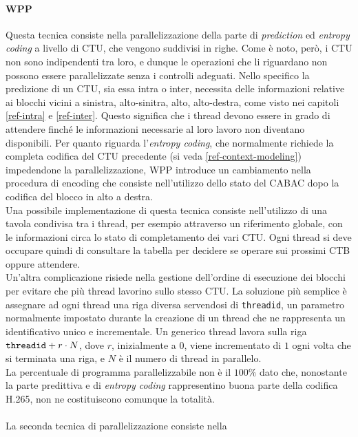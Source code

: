 \paragraph*{WPP} Questa tecnica consiste nella parallelizzazione della parte di 
\emph{prediction} ed \emph{entropy coding} a livello di CTU, che vengono 
suddivisi in righe.
Come è noto, però, i CTU non sono 
indipendenti tra loro, e dunque le operazioni che li riguardano non possono 
essere parallelizzate senza i controlli adeguati. Nello specifico la predizione 
di un CTU, sia essa intra o inter, necessita delle informazioni relative ai 
blocchi vicini a sinistra, alto-sinitra, alto, alto-destra, come visto nei 
capitoli \ref{ref-intra} e \ref{ref-inter}. Questo 
significa che i thread devono essere in grado di attendere finché le 
informazioni necessarie al loro lavoro non diventano disponibili. Per quanto 
riguarda l'\emph{entropy coding}, che normalmente richiede la completa codifica 
del CTU precedente (si veda \ref{ref-context-modeling}) impedendone la 
parallelizzazione, WPP introduce 
un 
cambiamento nella procedura di encoding che consiste nell'utilizzo dello stato 
del CABAC dopo la codifica del blocco in alto a destra. \\
Una possibile implementazione di questa tecnica consiste nell'utilizzo di una 
tavola condivisa tra i thread, per esempio attraverso un riferimento globale, 
con le informazioni circa lo stato di completamento dei vari CTU. Ogni thread 
si deve occupare quindi di consultare la tabella per decidere se 
operare sui prossimi CTB oppure attendere.\\
Un'altra complicazione risiede nella gestione dell'ordine di esecuzione dei 
blocchi 
per evitare che più thread lavorino sullo stesso CTU. La soluzione più semplice 
è assegnare ad ogni thread una riga diversa servendosi di \verb|threadid|, un 
parametro normalmente impostato durante la creazione di un thread che ne 
rappresenta un identificativo unico e incrementale. Un generico thread lavora 
sulla riga $\verb|threadid| + r \cdot N$, dove $r$, inizialmente a $0$, viene 
incrementato di $1$ ogni volta che si terminata una riga, e $N$ è il numero di 
thread in parallelo.  \\
La percentuale di programma parallelizzabile non è il $100\%$ dato che, 
nonostante 
la parte predittiva e di \emph{entropy coding} rappresentino buona parte della 
codifica H.265, non ne costituiscono comunque la totalità.
\\ \\
La seconda tecnica di parallelizzazione consiste nella 
